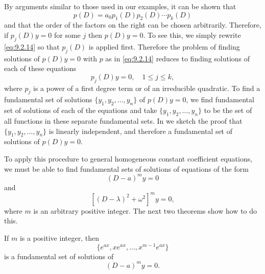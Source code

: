 By arguments similar to those used in our examples, it can be shown
that
\begin{equation} \label{eq:9.2.14}
p(D)=a_0p_1(D)p_2(D)\cdots p_k(D)
\end{equation}
and that the order of the factors on the right can be chosen
arbitrarily. Therefore, if $p_j(D)y=0$ for some $j$ then
$p(D)y=0$. To see this, we simply rewrite \eqref{eq:9.2.14} so that
$p_j(D)$ is applied first. Therefore the problem of finding solutions
of $p(D)y=0$ with $p$ as in \eqref{eq:9.2.14} reduces to finding solutions
of each of these equations
\[
p_j(D)y=0,\quad 1\le j\le k,
\]
where $p_j$ is a power of a first degree term or of an irreducible
quadratic. To find a fundamental set of
solutions
$\{y_1,y_2,\dots,y_n\}$ of $p(D)y=0$, we find fundamental set of
solutions of each of the equations and take $\{y_1,y_2,\dots,y_n\}$ to
be the set of all functions in these separate fundamental sets. In
 we sketch the proof that
$\{y_1,y_2,\dots,y_n\}$ is linearly independent, and therefore a
fundamental set of solutions of $p(D)y=0$.

To apply this procedure to general homogeneous constant coefficient
equations, we must be able to find fundamental sets of solutions of
equations of the form
\[
(D-a)^my=0
\]
and
\[
\left[(D-\lambda)^2+\omega^2\right]^my=0,
\]
where $m$ is an arbitrary positive integer. The next two theorems show
how to do this.

\begin{theorem}\label{thmtype:9.2.1}
If $m$ is a positive integer, then
\begin{equation} \label{eq:9.2.15}
\{e^{ax}, xe^{ax},\dots, x^{m-1}e^{ax}\}
\end{equation}
is a fundamental set of solutions of
\begin{equation} \label{eq:9.2.16}
(D-a)^my=0.
\end{equation}
\end{theorem}

